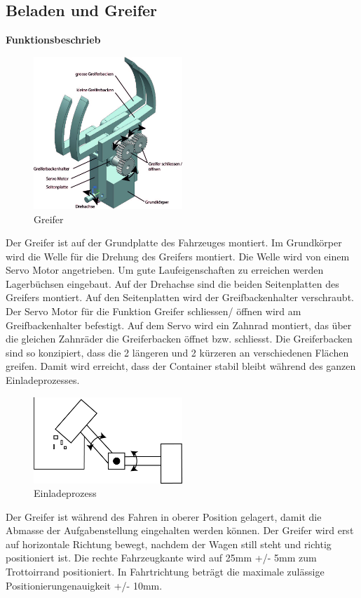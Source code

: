 \subsection{Beladen und Greifer}

\textbf{Funktionsbeschrieb}
\begin{figure}[H]
\centering
\includegraphics[width=0.5\textwidth]{03_Loesungskonzept/pictures/greifer3.jpg}
\caption{Greifer}
\end{figure}\flushleft

Der Greifer ist auf der Grundplatte des Fahrzeuges montiert. Im Grundkörper wird die Welle für die Drehung des Greifers montiert. Die Welle wird von einem Servo Motor angetrieben. Um gute Laufeigenschaften zu erreichen werden Lagerbüchsen eingebaut. Auf der Drehachse sind die beiden Seitenplatten des Greifers montiert. Auf den Seitenplatten wird der Greifbackenhalter verschraubt.  Der Servo Motor für die Funktion Greifer schliessen/ öffnen wird am Greifbackenhalter befestigt. Auf dem Servo wird ein Zahnrad montiert, das über die gleichen Zahnräder die Greiferbacken öffnet bzw. schliesst. Die Greiferbacken sind so konzipiert, dass die 2 längeren und 2 kürzeren an verschiedenen Flächen greifen. Damit wird erreicht, dass der Container stabil bleibt während des ganzen Einladeprozesses. 

\begin{figure}[H]
\centering
\includegraphics[width=0.5\textwidth]{03_Loesungskonzept/pictures/Beladen_1.png}
\caption{Einladeprozess}
\end{figure}\flushleft
Der Greifer ist während des Fahren in oberer Position gelagert, damit die Abmasse der Aufgabenstellung eingehalten werden können. Der Greifer wird erst auf horizontale Richtung bewegt, nachdem der Wagen still steht und richtig positioniert ist.
Die rechte Fahrzeugkante wird auf 25mm +/- 5mm zum Trottoirrand positioniert. In Fahrtrichtung beträgt die maximale zulässige Positionierungenauigkeit +/- 10mm.

